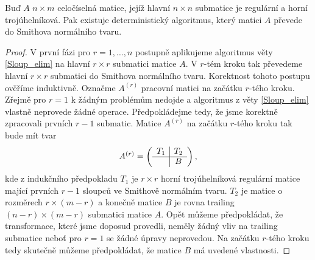 \begin{vet} \label{SNF_Triang}
Buď $ A $ $ n \times m $ celočíselná matice, jejíž hlavní $ n \times n $
submatice je regulární a horní trojúhelníková. Pak existuje deterministický
algoritmus, který matici $ A $ převede do Smithova normálního tvaru.
\end{vet}
\begin{proof}
V první fázi pro $ r = 1,\dots, n $ postupně aplikujeme algoritmus věty
\ref{Sloup_elim} na hlavní $ r \times r $ submatici matice $ A $. V $ r $-tém
kroku tak převedeme hlavní $ r \times r $ submatici do Smithova normálního
tvaru. Korektnost tohoto postupu ověříme induktivně. Označme $ A^{(r)} $ pracovní
matici na začátku $ r $-tého kroku. Zřejmě pro $ r = 1 $ k žádným problémům
nedojde a algoritmus z věty \ref{Sloup_elim} vlastně neprovede žádné operace.
Předpokládejme tedy, že jsme korektně zpracovali prvních $ r - 1 $ submatic.
Matice $ A^{(r)} $ na začátku $ r $-tého kroku tak bude mít tvar
\begin{align*}
A^{(r)} =
    \left(
    \begin{array}{c|c}
        T_1 & T_2 \\ \hline
            & B   \\
    \end{array}
    \right)
,
\end{align*}
kde z indukčního předpokladu $ T_1 $ je $ r \times r $ horní trojúhelníková
regulární matice mající prvních $ r - 1 $ sloupců ve Smithově normálním tvaru.
$ T_2 $ je matice o rozměrech $ r \times (m - r) $ a konečně matice $ B $ je
rovna trailing $ (n - r) \times (m - r) $ submatici matice $ A $. Opět můžeme
předpokládat, že transformace, které jsme doposud provedli, neměly
žádný vliv na trailing submatice neboť pro $ r = 1 $ se žádné úpravy neprovedou.
Na začátku $ r $-tého kroku tedy skutečně můžeme předpokládat, že matice $ B $
má uvedené vlastnosti.


\end{proof}
